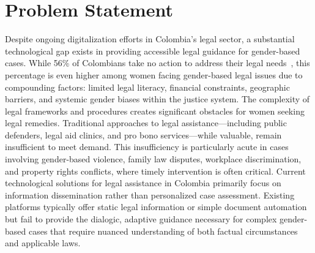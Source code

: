 \section{Problem Statement}
Despite ongoing digitalization efforts in Colombia's legal sector,
a substantial technological gap exists in providing accessible 
legal guidance for gender-based cases. While 56\% of Colombians 
take no action to address their legal needs~\cite{dnp2021}, 
this percentage is even higher among women facing gender-based legal 
issues due to compounding factors: limited legal literacy, financial 
constraints, geographic barriers, and systemic gender biases within 
the justice system.
The complexity of legal frameworks and procedures creates significant 
obstacles for women seeking legal remedies. Traditional approaches to 
legal assistance—including public defenders, legal aid clinics, 
and pro bono services—while valuable, remain insufficient to meet demand. 
This insufficiency is particularly acute in cases involving gender-based violence, 
family law disputes, workplace discrimination, and property rights conflicts, 
where timely intervention is often critical.
Current technological solutions for legal assistance in Colombia 
primarily focus on information dissemination rather than personalized 
case assessment. Existing platforms typically offer static legal 
information or simple document automation but fail to provide the dialogic,
adaptive guidance necessary for complex gender-based cases that require 
nuanced understanding of both factual circumstances and applicable 
laws.

